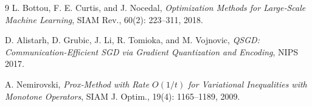 \documentclass{article}
\begin{document}
\begin{thebibliography}{9}
L. Bottou, F. E. Curtis, and J. Nocedal, \emph{Optimization Methods for Large‑Scale Machine Learning}, SIAM Rev., 60(2): 223–311, 2018.

D. Alistarh, D. Grubic, J. Li, R. Tomioka, and M. Vojnovic, \emph{QSGD: Communication-Efficient SGD via Gradient Quantization and Encoding}, NIPS 2017.

A. Nemirovski, \emph{Prox‑Method with Rate $O(1/t)$ for Variational Inequalities with Monotone Operators}, SIAM J. Optim., 19(4): 1165–1189, 2009.
\end{thebibliography}
\end{document}
